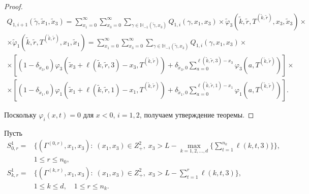 \begin{proof}
\begin{multline*}
Q_{1, i+1}(\tilde{\gamma}, \tilde{x}_1,  \tilde{x}_3)=\sum_{x_1=0}^{\infty} \sum_{x_3=0}^{\infty}\sum_{\gamma \in {\mathbb H}_{-1}(\tilde{\gamma}, x_3)} Q_{1, i}(\gamma, x_1, x_3) \times 
\tilde{\varphi}_3(\tilde{k}, \tilde{r},  T^{(\tilde{k}, \tilde{r})}, x_3, \tilde{x}_3) \times \\ \times 
\tilde{\varphi}_1(\tilde{k}, \tilde{r},  T^{(\tilde{k}, \tilde{r})}, x_1, \tilde{x}_1) 
= \sum_{x_1=0}^{\infty} \sum_{x_3=0}^{\infty} \sum_{\gamma \in {\mathbb H}_{-1}(\tilde{\gamma}, x_3)} Q_{1, i}(\gamma, x_1,  x_3) \times \\ \times
[ (1-\delta_{\tilde{x}_3, 0})\varphi_3(\tilde{x}_3 + \ell(\tilde{k}, \tilde{r}, 3) - x_3, T^{(\tilde{k}, \tilde{r})}) +\delta_{\tilde{x}_3, 0} \sum_{a=0}^{\ell(\tilde{k}, \tilde{r}, 3)-x_3}\varphi_3(a, T^{(\tilde{k}, \tilde{r})})] \times \\ 
\times 
[ (1-\delta_{\tilde{x}_1, 0})\varphi_1(\tilde{x}_1 + \ell(\tilde{k}, \tilde{r}, 1) - x_1, T^{(\tilde{k}, \tilde{r})}) +\delta_{\tilde{x}_1, 0} \sum_{a=0}^{\ell(\tilde{k}, \tilde{r}, 1)-x_1}\varphi_1(a, T^{(\tilde{k}, \tilde{r})})].
\end{multline*}

Поскольку  $\varphi_i(x, t)=0$ для $x<0$,  $i=1, 2$,  получаем утверждение теоремы.
\end{proof}

Пусть
\begin{align*}
  S^1_{0, r} = & 
  \biggl\{
  (\Gamma^{(0, r)}, x_1,  x_3) \colon \; (x_1,  x_3)\in Z^2_+, \; x_3 > L - \max\limits_{k=1,  2, 
    \ldots,  d}
  \biggl\{ \sum_{t=1}^{n_k} \ell({k, t, 3}) \biggl\}\biggl\}, \\
   & 1 \leqslant r \leqslant n_0,  \\
  S^1_{k, r} = & 
  \biggl\{
  (\Gamma^{(k, r)}, x_1,  x_3) \colon \; (x_1,  x_3)\in Z^2_+, \; x_3 > L - \sum_{t=1}^{r} \ell({k, t, 3})
  \biggr\},   \\
  & 1 \leqslant k \leqslant d,  \quad 1 \leqslant r \leqslant n_k.
\end{align*}

